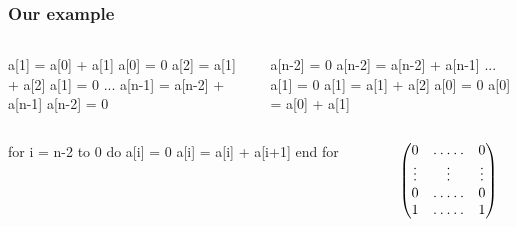 \documentclass[10pt,handout]{beamer}
\begin{document}
\begin{frame}[fragile]
  \frametitle{Our example}

  \begin{columns}
    \begin{column}{0.5\textwidth}
      \begin{center}
        \begin{minipage}{0.7\textwidth}
\begin{semiverbatim}
  a[1] = a[0] + a[1]
  a[0] = 0
  a[2] = a[1] + a[2]
  a[1] = 0
  ...
  a[n-1] = a[n-2] + a[n-1]
  a[n-2] = 0
\end{semiverbatim}
        \end{minipage}
      \end{center}
    \end{column}

    \begin{column}{0.5\textwidth}
      \begin{center}
        \begin{minipage}{0.7\textwidth}
\begin{semiverbatim}
  a[n-2] = 0
  a[n-2] = a[n-2] + a[n-1]
  ...
  a[1] = 0
  a[1] = a[1] + a[2]
  a[0] = 0
  a[0] = a[0] + a[1]
\end{semiverbatim}
        \end{minipage}
      \end{center}
    \end{column}
    \end{columns}
  
  \vfill
  \pause

  \begin{columns}

    \begin{column}{0.5\textwidth}
      \begin{center}
        \begin{minipage}{0.7\textwidth}
\begin{semiverbatim}
  for i = n-2 to 0 do
    a[i] = 0
    a[i] = a[i] + a[i+1]
  end for
\end{semiverbatim}
        \end{minipage}
      \end{center}
    \end{column}

    \begin{column}{0.5\textwidth}

      \begin{equation*}
        \begin{pmatrix}
          0 & \hdotsfor{3} & 0\\
          \vdots  &  &\vdots&& \vdots \\
          0 & \hdotsfor{3} & 0\\
          1 & \hdotsfor{3} & 1
        \end{pmatrix}
      \end{equation*}

    \end{column}
  \end{columns}
\end{frame}
\end{document}
